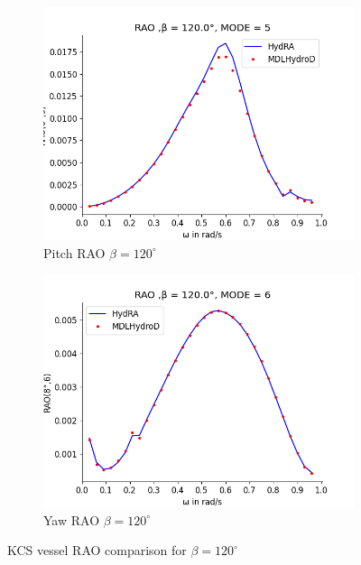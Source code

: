 \begin{figure}[H]
\begin{subfigure}[b]{0.49\textwidth}
        \includegraphics[width=\textwidth]{plots/kcs/rao/rao5.png}
        \caption{Pitch RAO $\beta = 120^{\circ}$}
    \end{subfigure}
    \begin{subfigure}[b]{0.49\textwidth}
        \includegraphics[width=\textwidth]{plots/kcs/rao/rao6.png}
        \caption{Yaw RAO $\beta = 120^{\circ}$}
    \end{subfigure}
    \caption{KCS vessel RAO comparison for $\beta= 120^{\circ}$}
    \label{fig:kcs_rao_120}
\end{figure}
\newpage
